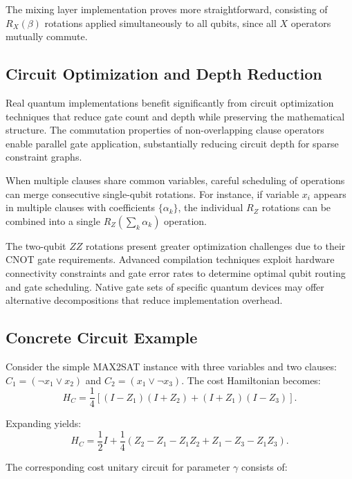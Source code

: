 \documentclass[%
 reprint,
 amsmath,amssymb,
 aps,
]{revtex4-2}
\begin{document}
The mixing layer implementation proves more straightforward, consisting of $R_X(\beta)$ rotations applied simultaneously to all qubits, since all $X$ operators mutually commute.

\subsection{Circuit Optimization and Depth Reduction}
\label{subsec:optimization}

Real quantum implementations benefit significantly from circuit optimization techniques that reduce gate count and depth while preserving the mathematical structure. The commutation properties of non-overlapping clause operators enable parallel gate application, substantially reducing circuit depth for sparse constraint graphs.

When multiple clauses share common variables, careful scheduling of operations can merge consecutive single-qubit rotations. For instance, if variable $x_i$ appears in multiple clauses with coefficients $\{\alpha_k\}$, the individual $R_Z$ rotations can be combined into a single $R_Z(\sum_k \alpha_k)$ operation.

The two-qubit $ZZ$ rotations present greater optimization challenges due to their CNOT gate requirements. Advanced compilation techniques exploit hardware connectivity constraints and gate error rates to determine optimal qubit routing and gate scheduling. Native gate sets of specific quantum devices may offer alternative decompositions that reduce implementation overhead.

\subsection{Concrete Circuit Example}
\label{subsec:example}

Consider the simple MAX2SAT instance with three variables and two clauses: $C_1 = (\neg x_1 \vee x_2)$ and $C_2 = (x_1 \vee \neg x_3)$. The cost Hamiltonian becomes:
\begin{equation}
H_C = \frac{1}{4}[(I - Z_1)(I + Z_2) + (I + Z_1)(I - Z_3)].
\label{eq:example_hamiltonian}
\end{equation}

Expanding yields:
\begin{equation}
H_C = \frac{1}{2}I + \frac{1}{4}(Z_2 - Z_1 - Z_1Z_2 + Z_1 - Z_3 - Z_1Z_3).
\label{eq:expanded_example}
\end{equation}

The corresponding cost unitary circuit for parameter $\gamma$ consists of:
\end{document}
